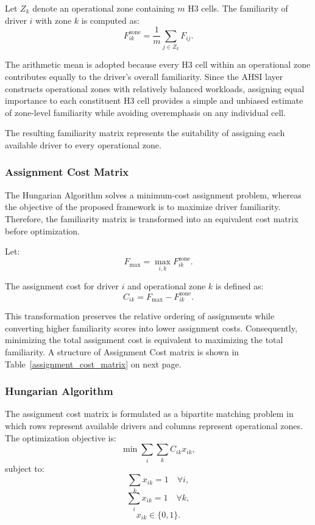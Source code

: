 \documentclass{article}
\begin{document}
Let $Z_k$ denote an operational zone containing $m$ H3 cells. The familiarity of driver $i$ with zone $k$ is computed as:
\begin{equation}
F_{ik}^{\text{zone}} = \frac{1}{m} \sum_{j \in Z_k} F_{ij}.
\end{equation}

The arithmetic mean is adopted because every H3 cell within an operational zone contributes equally to the driver's overall familiarity. Since the AHSI layer constructs operational zones with relatively balanced workloads, assigning equal importance to each constituent H3 cell provides a simple and unbiased estimate of zone-level familiarity while avoiding overemphasis on any individual cell.

The resulting familiarity matrix represents the suitability of assigning each available driver to every operational zone.

\subsubsection{Assignment Cost Matrix}
The Hungarian Algorithm solves a minimum-cost assignment problem, whereas the objective of the proposed framework is to maximize driver familiarity. Therefore, the familiarity matrix is transformed into an equivalent cost matrix before optimization.

Let:
\begin{equation}
F_{\max} = \max_{i,k} F_{ik}^{\text{zone}}.
\end{equation}

The assignment cost for driver $i$ and operational zone $k$ is defined as:
\begin{equation}
C_{ik} = F_{\max} - F_{ik}^{\text{zone}}.
\end{equation}

This transformation preserves the relative ordering of assignments while converting higher familiarity scores into lower assignment costs. Consequently, minimizing the total assignment cost is equivalent to maximizing the total familiarity. A structure of Assignment Cost matrix is shown in Table~\ref{assignment_cost_matrix} on next page.

\subsubsection{Hungarian Algorithm}
The assignment cost matrix is formulated as a bipartite matching problem in which rows represent available drivers and columns represent operational zones. The optimization objective is:
\begin{equation}
\min \sum_i \sum_k C_{ik} x_{ik},
\end{equation}
subject to:
\begin{equation}
\sum_k x_{ik} = 1 \quad \forall i,
\end{equation}
\begin{equation}
\sum_i x_{ik} = 1 \quad \forall k,
\end{equation}
\begin{equation}
x_{ik} \in \{0, 1\}.
\end{equation}
\end{document}
